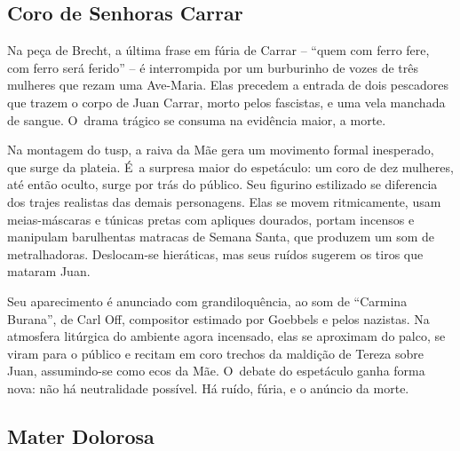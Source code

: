 {\subsection{Coro de Senhoras Carrar}

Na peça de Brecht, a última frase em fúria de Carrar -- “quem com ferro
fere, com ferro será ferido” -- é interrompida por um burburinho de vozes
de três mulheres que rezam uma Ave-Maria. Elas precedem a entrada de
dois pescadores que trazem o corpo de Juan Carrar, morto pelos
fascistas, e uma vela manchada de sangue. O~drama trágico se consuma na
evidência maior, a morte.

Na montagem do {\sc tusp}, a raiva da Mãe gera um movimento formal inesperado,
que surge da plateia. É~a surpresa maior do espetáculo: um coro de dez
mulheres, até então oculto, surge por trás do público. Seu figurino
estilizado se diferencia dos trajes realistas das demais personagens.
Elas se movem ritmicamente, usam meias-máscaras e túnicas pretas com
apliques dourados, portam incensos e manipulam barulhentas matracas de
Semana Santa, que produzem um som de metralhadoras. Deslocam-se
hieráticas, mas seus ruídos sugerem os tiros que mataram Juan.

Seu aparecimento é anunciado com grandiloquência, ao som de “Carmina
Burana”, de Carl Off, compositor estimado por Goebbels e pelos nazistas.
Na atmosfera litúrgica do ambiente agora incensado, elas se aproximam do
palco, se viram para o público e recitam em coro trechos da maldição de
Tereza sobre Juan, assumindo-se como ecos da Mãe. O~debate do espetáculo
ganha forma nova: não há neutralidade possível. Há ruído, fúria, e o
anúncio da morte.


\subsection{Mater Dolorosa}

}
